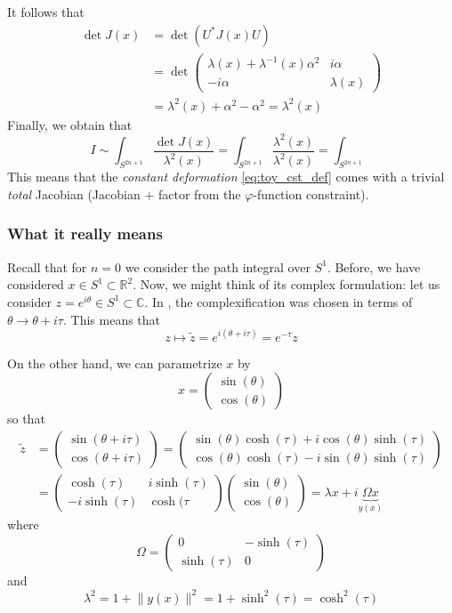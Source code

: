 \documentclass[a4paper,11pt]{article}
\theoremstyle{definition}
\newcommand{\RR}{\mathbb{R}}
\newcommand{\CC}{\mathbb{C}}
\newcommand{\mat}[4]{\begin{pmatrix} #1 & #2 \\ #3 & #4 \end{pmatrix}}
\newcommand{\vek}[2]{\begin{pmatrix} #1 \\ #2 \end{pmatrix}}
\begin{document}
It follows that 
\begin{equation}
  \begin{split} 
    \det J(x) &= \det( U^* J(x) U) \\
    &= \det \mat{\lambda(x) + \lambda^{-1}(x) \alpha^2}{i\alpha}{-i\alpha}{\lambda(x)} \\
    &= \lambda^2(x) + \alpha^2 - \alpha^2 = \lambda^2(x)
  \end{split}
\end{equation}
Finally, we obtain that
\begin{equation}
  I \sim \int_{S^{2n+1}} \frac{\det J(x)}{\lambda^2(x)} = \int_{S^{2n+1}} \frac{\lambda^2(x)}{\lambda^2(x)} = \int_{S^{2n+1}}
\end{equation}
This means that the \emph{constant deformation} \eqref{eq:toy_cst_def} comes with a trivial \emph{total} Jacobian (Jacobian + factor from the $\varphi$-function constraint).

\subsubsection{What it really means}
Recall that for $n=0$ we consider the path integral over $S^1$.
Before, we have considered $x \in S^1 \subset \RR^2$.
Now, we might think of its complex formulation: let us consider $z = e^{i\theta} \in S^1 \subset \CC$.
In \cite{}, the complexification was chosen in terms of $\theta \to \theta + i \tau$. 
This means that 
\begin{equation}
  z \mapsto \tilde z = e^{i(\theta + i\tau)} = e^{-\tau} z
\end{equation}

On the other hand, we can parametrize $x$ by 
\begin{equation}
  x = \vek{\sin(\theta)}{\cos(\theta)}
\end{equation}
so that 
\begin{equation}
  \begin{split} 
    \tilde z &= \vek{\sin(\theta + i \tau)}{\cos(\theta + i\tau)} = \vek{\sin(\theta)\cosh(\tau) + i \cos(\theta)\sinh(\tau)}{\cos(\theta)\cosh(\tau) - i \sin(\theta)\sinh(\tau)} \\
    &= \mat{\cosh(\tau)}{i \sinh(\tau)}{-i \sinh(\tau)}{\cosh(\tau} \vek{\sin(\theta)}{\cos(\theta)} = \lambda x + i \underbrace{\Omega x}_{y(x)}
  \end{split}
\end{equation}
where 
\begin{equation}
  \Omega = \mat{0}{-\sinh(\tau)}{\sinh(\tau)}{0} 
\end{equation}
and
\begin{equation}
  \lambda^2 = 1 + \lVert y(x) \rVert^2 = 1 + \sinh^2(\tau) = \cosh^2(\tau)
\end{equation}
\end{document}
